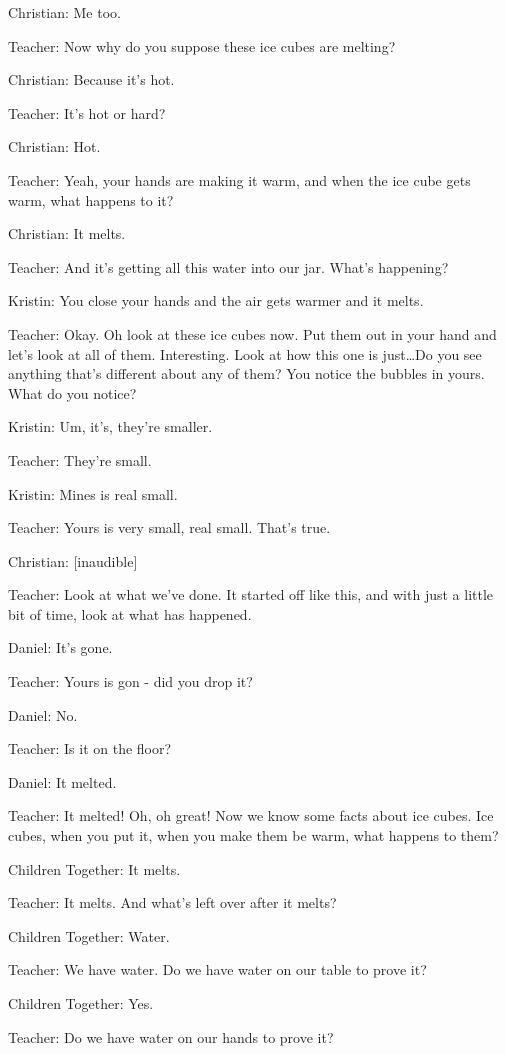 Christian: Me too.

Teacher: Now why do you suppose these ice cubes are melting?

Christian: Because it's hot.

Teacher: It's hot or hard?

Christian: Hot.

Teacher: Yeah, your hands are making it warm, and when the ice cube gets warm, what happens to it?

Christian: It melts.

Teacher: And it's getting all this water into our jar. What's happening?

Kristin: You close your hands and the air gets warmer and it melts.

Teacher: Okay. Oh look at these ice cubes now. Put them out in your hand and let's look at all of them. Interesting. Look at how this one is just\dots Do you see anything that's different about any of them? You notice the bubbles in yours. What do you notice?

Kristin: Um, it's, they're smaller.

Teacher: They're small.

Kristin: Mines is real small.

Teacher: Yours is very small, real small. That's true.

Christian: [inaudible]

Teacher: Look at what we've done. It started off like this, and with just a little bit of time, look at what has happened.

Daniel: It's gone.

Teacher: Yours is gon - did you drop it?

Daniel: No.

Teacher: Is it on the floor?

Daniel: It melted.

Teacher: It melted! Oh, oh great! Now we know some facts about ice cubes. Ice cubes, when you put it, when you make them be warm, what happens to them?

Children Together: It melts.

Teacher: It melts. And what's left over after it melts?

Children Together: Water.

Teacher: We have water. Do we have water on our table to prove it?

Children Together: Yes.

Teacher: Do we have water on our hands to prove it?

